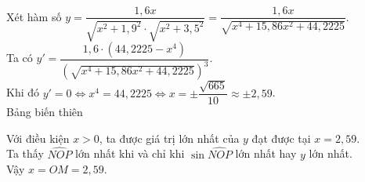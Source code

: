 \begin{bt}
{\begin{align*}
		\end{align*}
		Xét hàm số $y=\dfrac{1{,}6 x}{\sqrt{x^{2}+1{,}9^{2}} \cdot \sqrt{x^{2}+3,5^{2}}}=\dfrac{1{,}6  x}{\sqrt{x^{4}+15{,}86 x^{2}+44{,}2225}}$.\\
		Ta có $y'=\dfrac{1{,}6\cdot\left(44{,}2225-x^{4}\right)}{\left(\sqrt{x^{4}+15{,}86 x^{2}+44{,}2225}\right)^{3}}$.\\ 
		Khi  đó
		$y'=0 \Leftrightarrow x^{4}=44{,}2225 \Leftrightarrow  x= \pm \dfrac{\sqrt{665}}{10} \approx \pm 2{,}59$.\\
		 Bảng biến thiên
		\begin{center}
		\end{center}
		Với điều kiện $x>0$, ta được giá trị lớn nhất của $y$ đạt  được tại $x=2{,}59$.\\
		Ta thấy $\widehat{NOP}$ lớn nhất khi và chỉ  khi $\sin \widehat{NOP}$ lớn nhất hay $y$ lớn nhất.\\
	Vậy  $x=OM=2{,}59$.}
\end{bt}

